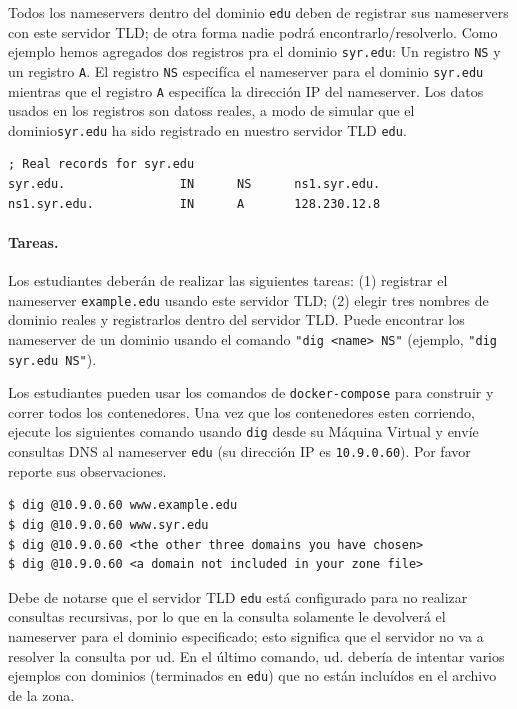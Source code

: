 Todos los nameservers dentro del dominio \texttt{edu} deben de registrar sus nameservers con este servidor TLD; de otra forma nadie podrá encontrarlo/resolverlo. Como ejemplo hemos agregados dos registros pra el dominio \texttt{syr.edu}: 
Un registro \texttt{NS} y un registro \texttt{A}.
El registro \texttt{NS} especifíca el nameserver para el dominio \texttt{syr.edu} mientras que el registro \texttt{A} especifíca la dirección IP del nameserver. Los datos usados en los registros son datoss reales, a modo de simular que el dominio\texttt{syr.edu} ha sido registrado en nuestro servidor TLD \texttt{edu}.


\begin{lstlisting}
; Real records for syr.edu
syr.edu.                IN      NS      ns1.syr.edu.
ns1.syr.edu.            IN      A       128.230.12.8
\end{lstlisting}
 

\paragraph{Tareas.}
Los estudiantes deberán de realizar las siguientes tareas: (1) registrar el nameserver \texttt{example.edu} usando este servidor TLD; (2) elegir tres nombres de dominio reales y registrarlos dentro del servidor TLD. Puede encontrar los nameserver de un dominio usando el comando \texttt{"dig <name> NS"} (ejemplo, \texttt{"dig syr.edu NS"}).

Los estudiantes pueden usar los comandos de \texttt{docker-compose} para construir y correr todos los contenedores.
Una vez que los contenedores esten corriendo, ejecute los siguientes comando usando \texttt{dig} desde su Máquina Virtual y envíe consultas DNS al nameserver \texttt{edu} (su dirección IP es \texttt{10.9.0.60}).
Por favor reporte sus observaciones.


\begin{lstlisting}
$ dig @10.9.0.60 www.example.edu
$ dig @10.9.0.60 www.syr.edu
$ dig @10.9.0.60 <the other three domains you have chosen>
$ dig @10.9.0.60 <a domain not included in your zone file>
\end{lstlisting}

Debe de notarse que el servidor TLD \texttt{edu} está configurado para no realizar consultas recursivas, por lo que en la consulta solamente le devolverá el nameserver para el dominio especificado; esto significa que el servidor no va a resolver la consulta por ud. 
En el último comando, ud. debería de intentar varios ejemplos con dominios (terminados en \texttt{edu}) que no están incluídos en el archivo de la zona.



